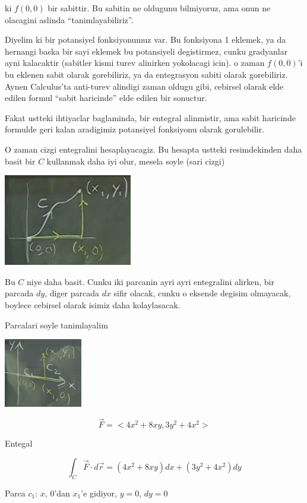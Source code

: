 \documentclass[12pt,fleqn]{article}
\begin{document}
ki $f(0,0)$ bir sabittir. Bu sabitin ne oldugunu bilmiyoruz, ama onun ne
olacagini aslinda ``tanimlayabiliriz''. 

Diyelim ki bir potansiyel fonksiyonumuz var. Bu fonksiyona 1 eklemek, ya da
hernangi baska bir sayi eklemek bu potansiyeli degistirmez, cunku
gradyanlar ayni kalacaktir (sabitler kismi turev alinirken yokolacagi
icin). o zaman $f(0,0)$'i bu eklenen sabit olarak gorebiliriz, ya da
entegrasyon sabiti olarak gorebiliriz. Aynen Calculus'ta anti-turev
alindigi zaman oldugu gibi, cebirsel olarak elde edilen formul ``sabit
haricinde'' elde edilen bir sonuctur. 

Fakat ustteki ihtiyaclar baglaminda, bir entegral alinmistir, ama sabit
haricinde formulde geri kalan aradigimiz potansiyel fonksiyonu olarak
gorulebilir. 

O zaman cizgi entegralini hesaplayacagiz. Bu hesapta ustteki resimdekinden
daha basit bir $C$ kullanmak daha iyi olur, mesela soyle (sari cizgi)

\includegraphics[height=4cm]{21_3.png}

Bu $C$ niye daha basit. Cunku iki parcanin ayri ayri entegralini alirken,
bir parcada $dy$, diger parcada $dx$ sifir olacak, cunku o eksende degisim
olmayacak, boylece cebirsel olarak isimiz daha kolaylasacak. 

Parcalari soyle tanimlayalim

\includegraphics[height=3cm]{21_4.png}

\[ \vec{F} = <4x^2 + 8xy, 3y^2 + 4x^2>\]

Entegal

\[ \int_C \vec{F} \cdot d\vec{r} = 
(4x^2 + 8xy) dx + (3y^2 + 4x^2) dy
\]

Parca $c_1$: $x$, 0'dan $x_1$'e gidiyor, $y=0$, $dy = 0$
\end{document}
